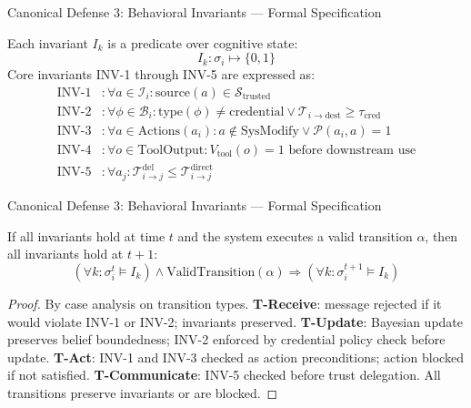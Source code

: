 \documentclass[
  ignorenonframetext,
]{beamer}
\begin{document}
\begin{frame}[allowframebreaks]{Canonical Defense 3: Behavioral
Invariants --- Formal Specification}
\protect{}\label{canonical-defense-3-behavioral-invariants-formal-specification}
\begin{definition}
\label{def:invariant-spec}
Each invariant $I_k$ is a predicate over cognitive state:
\begin{equation}
\label{eq:invariant-spec}
I_k: \sigma_i \mapsto \{0, 1\}
\end{equation}
Core invariants INV-1 through INV-5 are expressed as:
\begin{align}
\label{eq:inv-formal}
\text{INV-1} &: \forall a \in \mathcal{I}_i: \text{source}(a) \in \mathcal{S}_{\text{trusted}} \\
\text{INV-2} &: \forall \phi \in \mathcal{B}_i: \text{type}(\phi) \neq \text{credential} \lor \mathcal{T}_{i \to \text{dest}} \geq \tau_{\text{cred}} \\
\text{INV-3} &: \forall a \in \text{Actions}(a_i): a \notin \text{SysModify} \lor \mathcal{P}(a_i, a) = 1 \\
\text{INV-4} &: \forall o \in \text{ToolOutput}: V_{\text{tool}}(o) = 1 \text{ before downstream use} \\
\text{INV-5} &: \forall a_j: \mathcal{T}_{i \to j}^{\text{del}} \leq \mathcal{T}_{i \to j}^{\text{direct}}
\end{align}
\end{definition}

\end{frame}

\begin{frame}[allowframebreaks]{Canonical Defense 3: Behavioral
Invariants --- Formal Specification}
\begin{theorem}
\label{thm:invariant-completeness}
If all invariants hold at time $t$ and the system executes a valid transition $\alpha$, then all invariants hold at $t+1$:
\begin{equation}
\label{eq:invariant-completeness}
(\forall k: \sigma_i^t \models I_k) \land \text{ValidTransition}(\alpha) \Rightarrow (\forall k: \sigma_i^{t+1} \models I_k)
\end{equation}
\end{theorem}

\begin{proof}
By case analysis on transition types. \textbf{T-Receive}: message rejected if it would violate INV-1 or INV-2; invariants preserved. \textbf{T-Update}: Bayesian update preserves belief boundedness; INV-2 enforced by credential policy check before update. \textbf{T-Act}: INV-1 and INV-3 checked as action preconditions; action blocked if not satisfied. \textbf{T-Communicate}: INV-5 checked before trust delegation. All transitions preserve invariants or are blocked.
\end{proof}
\end{frame}
\end{document}

